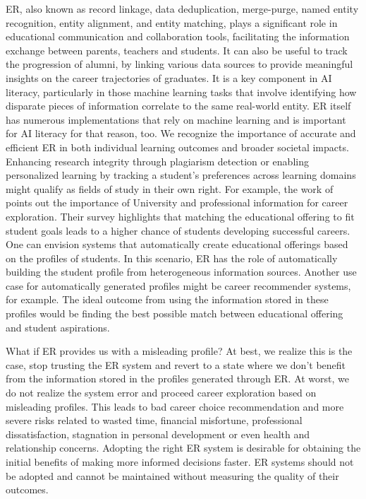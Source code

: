 \documentclass[a4paper,twoside]{article}
\begin{document}
    ER, also known as record linkage, data deduplication,
    merge-purge, named entity recognition, entity alignment, and entity
    matching, plays a significant role in educational communication and
    collaboration tools, facilitating the information exchange between parents,
    teachers and students.
    It can also be useful to track the progression of alumni, by linking various
    data sources to provide meaningful insights on the career trajectories of
    graduates.     
    It is a key component in AI literacy, particularly in those machine learning
    tasks that involve identifying how disparate pieces of information correlate
    to the same real-world entity.
    ER itself has numerous implementations that rely on machine
    learning and is important for AI literacy for that reason,
    too\cite{deepm2020}. 
    We recognize the importance of accurate and efficient ER in
    both individual learning outcomes and broader societal impacts.
    Enhancing research integrity through plagiarism detection or enabling
    personalized learning by tracking a student's preferences across learning
    domains might qualify as fields of study in their own right.     
    For example, the work of~\cite{chen2021careerexploration} points out the
    importance of University and professional information for career exploration.
    Their survey highlights that matching the educational offering to fit
    student goals leads to a higher chance of students developing successful
    careers.
    One can envision systems that automatically create educational offerings
    based on the profiles of students.
    In this scenario, ER has the role of automatically building the student
    profile from heterogeneous information sources.
    Another use case for automatically generated profiles might be career
    recommender systems, for example.
    The ideal outcome from using the information stored in these profiles would
    be finding the best possible match between educational offering and student
    aspirations.
    
    What if ER provides us with a misleading profile?
    At best, we realize this is the case, stop trusting the ER system and revert 
    to a state where we don't benefit from the information
    stored in the profiles generated through ER.
    At worst, we do not realize the system error and proceed career exploration
    based on misleading profiles.
    This leads to bad career choice recommendation and more severe risks related
    to wasted time, financial misfortune, professional dissatisfaction,
    stagnation in personal development or even health and relationship concerns.
    Adopting the right ER system is desirable for obtaining the
    initial benefits of making more informed decisions faster.
    ER systems should not be adopted and cannot be maintained without measuring
    the quality of their outcomes.
    
\end{document}
